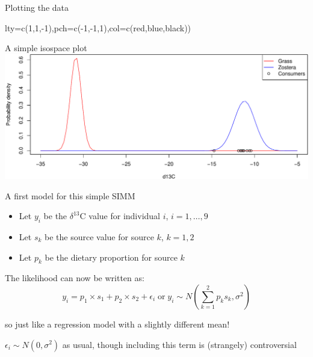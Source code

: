 \documentclass[
  ignorenonframetext,
  aspectratio=169]{beamer}
\newenvironment{Shaded}{\begin{snugshade}}{\end{snugshade}}
\newcommand{\AttributeTok}[1]{\textcolor[rgb]{0.77,0.63,0.00}{#1}}
\newcommand{\DecValTok}[1]{\textcolor[rgb]{0.00,0.00,0.81}{#1}}
\newcommand{\FunctionTok}[1]{\textcolor[rgb]{0.00,0.00,0.00}{#1}}
\newcommand{\NormalTok}[1]{#1}
\newcommand{\SpecialCharTok}[1]{\textcolor[rgb]{0.00,0.00,0.00}{#1}}
\newcommand{\StringTok}[1]{\textcolor[rgb]{0.31,0.60,0.02}{#1}}
\providecommand{\tightlist}{%
  \setlength{\itemsep}{0pt}\setlength{\parskip}{0pt}}
\begin{document}
\begin{frame}[fragile]{Plotting the data}
\begin{Shaded}
\begin{Highlighting}[]
       \AttributeTok{lty=}\FunctionTok{c}\NormalTok{(}\DecValTok{1}\NormalTok{,}\DecValTok{1}\NormalTok{,}\SpecialCharTok{{-}}\DecValTok{1}\NormalTok{),}\AttributeTok{pch=}\FunctionTok{c}\NormalTok{(}\SpecialCharTok{{-}}\DecValTok{1}\NormalTok{,}\SpecialCharTok{{-}}\DecValTok{1}\NormalTok{,}\DecValTok{1}\NormalTok{),}\AttributeTok{col=}\FunctionTok{c}\NormalTok{(}\StringTok{\textquotesingle{}red\textquotesingle{}}\NormalTok{,}\StringTok{\textquotesingle{}blue\textquotesingle{}}\NormalTok{,}\StringTok{\textquotesingle{}black\textquotesingle{}}\NormalTok{))}
\end{Highlighting}
\end{Shaded}
\end{frame}

\begin{frame}{A simple isospace plot}
\protect\hypertarget{a-simple-isospace-plot}{}
\includegraphics{reg_and_simms_files/figure-beamer/unnamed-chunk-10-1.pdf}
\end{frame}

\begin{frame}{A first model for this simple SIMM}
\protect\hypertarget{a-first-model-for-this-simple-simm}{}
\begin{itemize}
\tightlist
\item
  Let \(y_i\) be the \(\delta^{13}\)C value for individual \(i\),
  \(i=1,\ldots,9\)
\item
  Let \(s_k\) be the source value for source \(k\), \(k=1,2\)
\item
  Let \(p_k\) be the dietary proportion for source \(k\)
\end{itemize}

The likelihood can now be written as:
\[ y_i = p_1 \times s_1 + p_2 \times s_2 + \epsilon_i \;\mbox{or}\; y_i \sim N\left(\sum_{k=1}^2 p_ks_k,\sigma^2\right)\]

so just like a regression model with a slightly different mean!

\(\epsilon_i \sim N(0,\sigma^2)\) as usual, though including this term
is (strangely) controversial
\end{frame}
\end{document}
